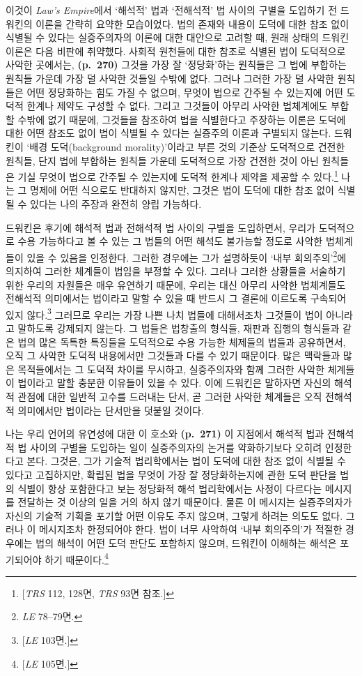 이것이 \emph{Law's Empire}에서 ‘해석적’ 법과 ‘전해석적’ 법 사이의 구별을
도입하기 전 드워킨의 이론을 간략히 요약한 모습이었다. 법의 존재와 내용이
도덕에 대한 참조 없이 식별될 수 있다는 실증주의자의 이론에 대한 대안으로
고려할 때, 원래 상태의 드워킨 이론은 다음 비판에 취약했다. 사회적
원천들에 대한 참조로 식별된 법이 도덕적으로 사악한 곳에서는,
\textbf{(p.~270)} 그것을 가장 잘 ‘정당화’하는 원칙들은 그 법에 부합하는
원칙들 가운데 가장 덜 사악한 것들일 수밖에 없다. 그러나 그러한 가장 덜
사악한 원칙들은 어떤 정당화하는 힘도 가질 수 없으며, 무엇이 법으로
간주될 수 있는지에 어떤 도덕적 한계나 제약도 구성할 수 없다. 그리고
그것들이 아무리 사악한 법체계에도 부합할 수밖에 없기 때문에, 그것들을
참조하여 법을 식별한다고 주장하는 이론은 도덕에 대한 어떤 참조도 없이
법이 식별될 수 있다는 실증주의 이론과 구별되지 않는다. 드워킨이 ‘배경
도덕(background morality)’이라고 부른 것의 기준상 도덕적으로 건전한
원칙들, 단지 법에 부합하는 원칙들 가운데 도덕적으로 가장 건전한 것이
아닌 원칙들은 기실 무엇이 법으로 간주될 수 있는지에 도덕적 한계나 제약을
제공할 수 있다.\footnote{{[}\emph{TRS} 112, 128면, \emph{TRS} 93면
  참조.{]}} 나는 그 명제에 어떤 식으로도 반대하지 않지만, 그것은 법이
도덕에 대한 참조 없이 식별될 수 있다는 나의 주장과 완전히 양립 가능하다.

드워킨은 후기에 해석적 법과 전해석적 법 사이의 구별을 도입하면서, 우리가
도덕적으로 수용 가능하다고 볼 수 있는 그 법들의 어떤 해석도 불가능할
정도로 사악한 법체계들이 있을 수 있음을 인정한다. 그러한 경우에는 그가
설명하듯이 ‘내부 회의주의’\footnote{\emph{LE} 78--79면.}에 의지하여
그러한 체계들이 법임을 부정할 수 있다. 그러나 그러한 상황들을 서술하기
위한 우리의 자원들은 매우 유연하기 때문에, 우리는 대신 아무리 사악한
법체계들도 전해석적 의미에서는 법이라고 말할 수 있을 때 반드시 그 결론에
이르도록 구속되어 있지 않다.\footnote{{[}\emph{LE} 103면.{]}} 그러므로
우리는 가장 나쁜 나치 법들에 대해서조차 그것들이 법이 아니라고 말하도록
강제되지 않는다. 그 법들은 법창출의 형식들, 재판과 집행의 형식들과 같은
법의 많은 독특한 특징들을 도덕적으로 수용 가능한 체제들의 법들과
공유하면서, 오직 그 사악한 도덕적 내용에서만 그것들과 다를 수 있기
때문이다. 많은 맥락들과 많은 목적들에서는 그 도덕적 차이를 무시하고,
실증주의자와 함께 그러한 사악한 체계들이 법이라고 말할 충분한 이유들이
있을 수 있다. 이에 드워킨은 말하자면 자신의 해석적 관점에 대한 일반적
고수를 드러내는 단서, 곧 그러한 사악한 체계들은 오직 전해석적 의미에서만
법이라는 단서만을 덧붙일 것이다.

나는 우리 언어의 유연성에 대한 이 호소와 \textbf{(p.~271)} 이 지점에서
해석적 법과 전해석적 법 사이의 구별을 도입하는 일이 실증주의자의 논거를
약화하기보다 오히려 인정한다고 본다. 그것은, 그가 기술적 법리학에서는
법이 도덕에 대한 참조 없이 식별될 수 있다고 고집하지만, 확립된 법을
무엇이 가장 잘 정당화하는지에 관한 도덕 판단을 법의 식별이 항상
포함한다고 보는 정당화적 해석 법리학에서는 사정이 다르다는 메시지를
전달하는 것 이상의 일을 거의 하지 않기 때문이다. 물론 이 메시지는
실증주의자가 자신의 기술적 기획을 포기할 어떤 이유도 주지 않으며, 그렇게
하려는 의도도 없다. 그러나 이 메시지조차 한정되어야 한다. 법이 너무
사악하여 ‘내부 회의주의’가 적절한 경우에는 법의 해석이 어떤 도덕 판단도
포함하지 않으며, 드워킨이 이해하는 해석은 포기되어야 하기
때문이다.\footnote{{[}\emph{LE} 105면.{]}}

